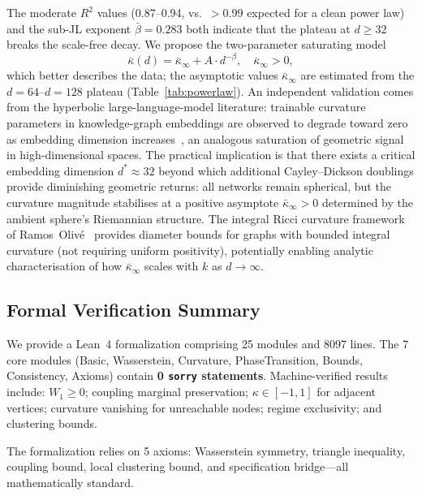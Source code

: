 \documentclass[11pt,a4paper]{article}
\newcommand{\kbar}{\bar{\kappa}}
\begin{document}
The moderate $R^2$ values (0.87--0.94, vs.\ $>0.99$ expected for a clean power law) and the sub-JL exponent $\bar\beta=0.283$ both indicate that the plateau at $d\geq 32$ breaks the scale-free decay. We propose the two-parameter saturating model
\begin{equation}
  \kbar(d) = \kbar_\infty + A\cdot d^{-\beta}, \quad \kbar_\infty > 0,
  \label{eq:saturation}
\end{equation}
which better describes the data; the asymptotic values $\kbar_\infty$ are estimated from the $d=64$--$d=128$ plateau (Table~\ref{tab:powerlaw}). An independent validation comes from the hyperbolic large-language-model literature: trainable curvature parameters in knowledge-graph embeddings are observed to degrade toward zero as embedding dimension increases~\cite{wu2025semantic}, an analogous saturation of geometric signal in high-dimensional spaces. The practical implication is that there exists a critical embedding dimension $d^* \approx 32$ beyond which additional Cayley--Dickson doublings provide diminishing geometric returns: all networks remain spherical, but the curvature magnitude stabilises at a positive asymptote $\kbar_\infty > 0$ determined by the ambient sphere's Riemannian structure. The integral Ricci curvature framework of Ramos~Oliv\'e~\cite{ramosOlive2025integral} provides diameter bounds for graphs with bounded integral curvature (not requiring uniform positivity), potentially enabling analytic characterisation of how $\kbar_\infty$ scales with $k$ as $d\to\infty$.

\subsection{Formal Verification Summary}
\label{sec:lean}

We provide a Lean~4 formalization comprising 25 modules and 8097 lines. The 7 core modules (Basic, Wasserstein, Curvature, PhaseTransition, Bounds, Consistency, Axioms) contain \textbf{0 \texttt{sorry} statements}. Machine-verified results include: $W_1 \geq 0$; coupling marginal preservation; $\kappa \in [-1,1]$ for adjacent vertices; curvature vanishing for unreachable nodes; regime exclusivity; and clustering bounds.

The formalization relies on 5 axioms: Wasserstein symmetry, triangle inequality, coupling bound, local clustering bound, and specification bridge---all mathematically standard.
\end{document}
